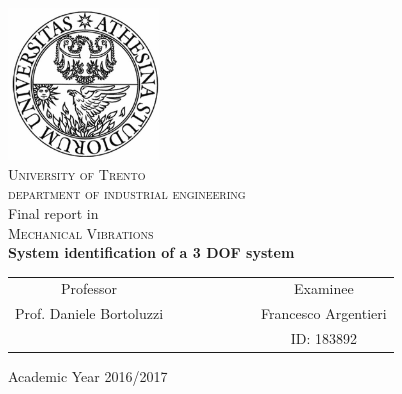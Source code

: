 \begin{titlepage}
 \begin{center}
 \includegraphics[width=4cm]{unitn.jpg}\\
 \vspace{1.5em}
 {\Large \textsc{University of Trento}}\\
 \vspace{1.5em}
 {\Large \textsc{department of industrial engineering}}\\
 \vspace{4em}
 {\normalsize Final report in}\\
 \vspace{1.5em}
 {\Large \textsc{Mechanical Vibrations}}\\
 \vspace{4em}
 {\LARGE\textbf{
 	System identification of a 3 DOF system
 }}\\
 \end{center}

\vskip 2.5cm
 \begin{center}
 \begin{tabular}{c c c c c c c c}
 Professor & & & & & & & Examinee\\[0.2cm]
 \large{Prof. Daniele Bortoluzzi} & & & & & & & \large{Francesco Argentieri}\\[0.4cm]
  & & & & & & & ID: 183892\\[0.2cm]
 \end{tabular}
 \end{center}

\vskip 4cm
\begin{center}
{\normalsize Academic Year 2016/2017}
\end{center}
\end{titlepage}

\clearpage{\pagestyle{empty}\cleardoublepage}
